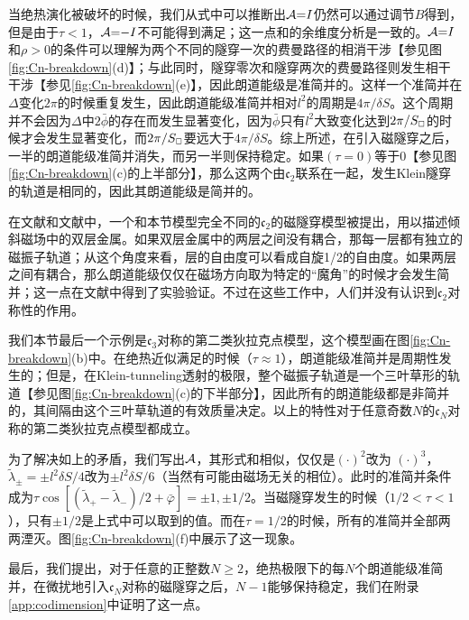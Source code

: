 当绝热演化被破坏的时候，我们从式中可以推断出${\cal A}{=}I$仍然可以通过调节$B$得到，但是由于$\tau{<}1$，${\cal A}{=}{-}I$不可能得到满足；这一点和的余维度分析是一致的。${\cal A}{=}I$和$\rho{>}0$的条件可以理解为两个不同的隧穿一次的费曼路径的相消干涉【参见图 \ref{fig:Cn-breakdown}(d)】；与此同时，隧穿零次和隧穿两次的费曼路径则发生相干干涉【参见\ref{fig:Cn-breakdown}(e)】，因此朗道能级是准简并的。这样一个准简并在$\Delta$变化$2\pi$的时候重复发生，因此朗道能级准简并相对$l^2$的周期是$4\pi/\delta S$。这个周期并不会因为$\Delta$中$2\bar{\phi}$的存在而发生显著变化，因为$\bar{\phi}$只有$l^2$大致变化达到$2\pi/S_{\scriptscriptstyle{\square}}$的时候才会发生显著变化，而$2\pi/S_{\scriptscriptstyle{\square}}$要远大于$4\pi/\delta S$。综上所述，在引入磁隧穿之后，一半的朗道能级准简并消失，而另一半则保持稳定。如果$(\tau{=}0)$等于0【参见图\ref{fig:Cn-breakdown}(c)的上半部分】，那么这两个由$\mathfrak{c}_2$联系在一起，发生Klein隧穿的轨道是相同的，因此其朗道能级是简并的。


在文献和文献中，一个和本节模型完全不同的$\mathfrak{c}_2$的磁隧穿模型被提出，用以描述倾斜磁场中的双层金属。如果双层金属中的两层之间没有耦合，那每一层都有独立的磁振子轨道；从这个角度来看，层的自由度可以看成自旋1/2的自由度。如果两层之间有耦合，那么朗道能级仅仅在磁场方向取为特定的“魔角”的时候才会发生简并；这一点在文献中得到了实验验证。不过在这些工作中，人们并没有认识到$\mathfrak{c}_2$对称性的作用。 


我们本节最后一个示例是$\mathfrak{c}_3$对称的第二类狄拉克点模型，这个模型画在图\ref{fig:Cn-breakdown}(b)中。在绝热近似满足的时候（$\tau{\approx}1$），朗道能级准简并是周期性发生的；但是，在Klein-tunneling透射的极限，整个磁振子轨道是一个三叶草形的轨道【参见图\ref{fig:Cn-breakdown}(c)的下半部分】，因此所有的朗道能级都是非简并的，其间隔由这个三叶草轨道的有效质量决定。以上的特性对于任意奇数$N$的$\mathfrak{c}_N$对称的第二类狄拉克点模型都成立。

为了解决如上的矛盾，我们写出${\cal A}$，其形式和相似，仅仅是$(\cdot)^2$改为
$(\cdot)^3$，$\tilde{\lambda}_\pm{=}{\pm} l^2\delta S/4$改为$\pm l^2\delta S/6$（当然有可能由磁场无关的相位）。此时的准简并条件成为$\tau\cos[(\tilde{\lambda}_+{-}\tilde{\lambda}_-)/2{+}\bar{\varphi}]{=}{\pm} 1,{\pm} 1/2$。当磁隧穿发生的时候（$1/2{<}\tau {<}1$），只有$\pm 1/2$是上式中可以取到的值。而在$\tau{=}1/2$的时候，所有的准简并全部两两湮灭。图\ref{fig:Cn-breakdown}(f)中展示了这一现象。


最后，我们提出，对于任意的正整数$N{\geq}2$，绝热极限下的每$N$个朗道能级准简并，在微扰地引入$\mathfrak{c}_N$对称的磁隧穿之后，$N{-}1$能够保持稳定，我们在附录\ref{app:codimension}中证明了这一点。

